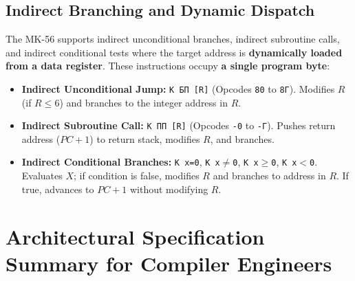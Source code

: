 \documentclass[11pt,a4paper]{article}
\begin{document}
\subsection{Indirect Branching and Dynamic Dispatch}
The MK-56 supports indirect unconditional branches, indirect subroutine calls, and indirect conditional tests where the target address is \textbf{dynamically loaded from a data register}. These instructions occupy \textbf{a single program byte}:
\begin{itemize}
    \item \textbf{Indirect Unconditional Jump:} \texttt{K БП [R]} (Opcodes \texttt{80} to \texttt{8Г}). Modifies $R$ (if $R \le 6$) and branches to the integer address in $R$.
    \item \textbf{Indirect Subroutine Call:} \texttt{K ПП [R]} (Opcodes \texttt{-0} to \texttt{-Г}). Pushes return address ($PC + 1$) to return stack, modifies $R$, and branches.
    \item \textbf{Indirect Conditional Branches:} \texttt{K x=0}, \texttt{K x$\ne$0}, \texttt{K x$\ge$0}, \texttt{K x$<$0}. Evaluates $X$; if condition is false, modifies $R$ and branches to address in $R$. If true, advances to $PC + 1$ without modifying $R$.
\end{itemize}

\newpage

\section{Architectural Specification Summary for Compiler Engineers}
\end{document}
